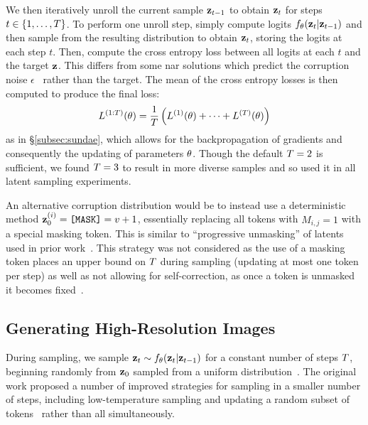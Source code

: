 We then iteratively unroll the current sample $\mathbf{z}_{t-1}$ to obtain
$\mathbf{z}_t$ for steps $t\in \{1, \dots, T\}$. To perform one unroll
step, simply compute logits $f_\theta(\mathbf{z}_t \vert \mathbf{z}_{t-1})$ and then
sample from the resulting distribution to obtain $\mathbf{z}_t$, storing the logits
at each step $t$. Then, compute the cross entropy loss between all logits at each
$t$ and the target $\mathbf{z}$. This differs from some \gls{nar} solutions
which predict the corruption noise $\epsilon$~\cite{ho2020ddpm} rather than the
target. The mean of the cross entropy losses is then computed to produce
the final loss: 
\begin{equation} 
    L^{(1:T)}(\theta) = \frac{1}{T} \left(L^{(1)}(\theta) +
    \dots + L^{(T)}(\theta) \right) 
\end{equation} 
as in \S\ref{subsec:sundae}, which allows for the backpropagation of gradients
and consequently the updating of parameters $\theta$. Though the
default $T = 2$ is sufficient, we found $T = 3$ to result
in more diverse samples and so used it in all latent sampling experiments.

An alternative corruption distribution would be to instead use a deterministic
method $\mathbf{z}_0^{(i)}=\texttt{[MASK]}=v+1$, essentially
replacing all tokens with $M_{i,j} = 1$ with a special masking token. This is
similar to ``progressive unmasking'' of latents used in prior
work~\cite{bondtaylor2021unleashing,austin2021structured}. This strategy was not
considered as the use of a masking token places an upper bound on $T$
during sampling (updating at most one token per step) as well as not allowing
for self-correction, as once a token is unmasked it becomes
fixed~\cite{bondtaylor2021unleashing,austin2021structured}. 

\subsection{Generating High-Resolution Images}
\label{subsec:sundaeSampling}

During sampling, we sample $\mathbf{z}_t \sim f_\theta(\mathbf{z}_t \vert
\mathbf{z}_{t-1})$ for a constant number of steps $T$, beginning
randomly from $\mathbf{z}_0$ sampled from a uniform
distribution~\cite{savinov2022stepunrolled}. The original work proposed a number
of improved strategies for sampling in a smaller number of steps, including
low-temperature sampling and updating a random subset of
tokens~\cite{savinov2022stepunrolled} rather than all simultaneously.

